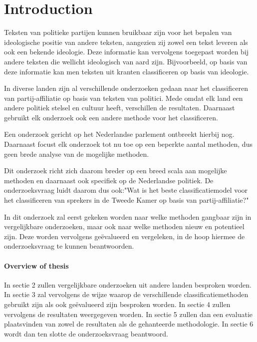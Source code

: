 \section{Introduction}
\label{sec:intro}
Teksten van politieke partijen kunnen bruikbaar zijn voor het bepalen van ideologische positie van andere teksten, aangezien zij zowel een tekst leveren als ook een bekende ideologie. Deze informatie kan vervolgens toegepast worden bij andere teksten die wellicht ideologisch van aard zijn. Bijvoorbeeld, op basis van deze informatie kan men teksten uit kranten classificeren op basis van ideologie.\par
In diverse landen zijn al verschillende onderzoeken gedaan naar het classificeren van partij-affiliatie op basis van teksten van politici.\cite{Ferreira2016UsingTT} Mede omdat elk land een andere politiek stelsel en cultuur heeft, verschillen de resultaten. Daarnaast gebruikt elk onderzoek ook een andere methode voor het classificeren. \par
Een onderzoek gericht op het Nederlandse parlement ontbreekt hierbij nog. Daarnaast focust elk onderzoek tot nu toe op een beperkte aantal methoden, dus geen brede analyse van de mogelijke methoden. \par
Dit onderzoek richt zich daarom breder op een breed scala aan mogelijke methoden en daarnaast ook specifiek op de Nederlandse politiek. De onderzoeksvraag luidt daarom dus ook:"Wat is het beste classificatiemodel voor het classificeren van sprekers in de Tweede Kamer op basis van partij-affiliatie?"\par
In dit onderzoek zal eerst gekeken worden naar welke methoden gangbaar zijn in vergelijkbare onderzoeken, maar ook naar welke methoden nieuw en potentieel zijn. Deze worden vervolgens geëvalueerd en vergeleken, in de hoop hiermee de onderzoeksvraag te kunnen beantwoorden.


\paragraph{Overview of thesis}
In sectie 2 zullen vergelijkbare onderzoeken uit andere landen besproken worden. In sectie 3 zal vervolgens de wijze waarop de verschillende classificatiemethoden gebruikt zijn als ook geëvalueerd zijn besproken worden. In sectie 4 zullen vervolgens de resultaten weergegeven worden. In sectie 5 zullen dan een evaluatie plaatsvinden van zowel de resultaten als de gehanteerde methodologie. In sectie 6 wordt dan ten slotte de onderzoeksvraag beantwoord.
